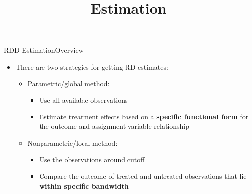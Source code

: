 \documentclass[hyperref={pdfpagelabels=false}]{beamer}
\begin{document}
\title[]
{Estimation}

\author
{}

\institute{}

\date
{}

\begin{frame}{}
	\titlepage
\end{frame}



\begin{frame}{RDD Estimation}{Overview}
	\begin{itemize}
		
		\item There are two strategies for getting RD estimates:
		\begin{itemize}
			\vspace{0.2cm}
			\item[1] Parametric/global method:
			\vspace{0.2cm}  
			\begin{itemize}
				\item Use all available observations
				\vspace{0.2cm}
				\item Estimate treatment effects based on a \textbf{specific functional form} for the outcome and assignment variable relationship
								\vspace{0.2cm}
			\end{itemize}
				\item[2] Nonparametric/local method:
			\vspace{0.2cm} 
			\begin{itemize}
				\item Use the observations around cutoff
				\vspace{0.2cm}
				\item Compare the outcome of treated and untreated observations that lie \textbf{within specific bandwidth}
			\end{itemize}
			
		\end{itemize}
		
	\end{itemize}
\end{frame}
\end{document}
